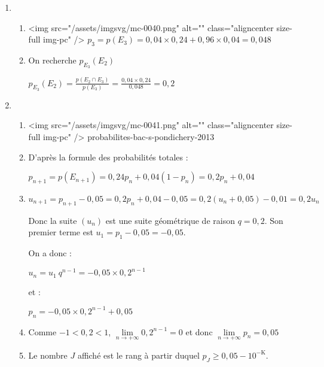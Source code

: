 \begin{corrige}
     \begin{enumerate}
          \item
          \begin{enumerate}[label=\alph*.]
               \item
               <img src="/assets/imgsvg/mc-0040.png" alt="" class="aligncenter size-full  img-pc" />
               $p_{3}=p\left(E_{3}\right)=0,04\times 0,24+0,96\times 0,04=0,048$
               \item
               On recherche $p_{E_{3}}\left(E_{2}\right)$
               \par
               $p_{E_{3}}\left(E_{2}\right)=\frac{p\left(E_{2} \cap  E_{3}\right)}{p\left(E_{3}\right)}=\frac{0,04\times 0,24}{0,048}=0,2$
          \end{enumerate}
          \item
          \begin{enumerate}[label=\alph*.]
               \item
               <img src="/assets/imgsvg/mc-0041.png" alt="" class="aligncenter size-full  img-pc" />
probabilites-bac-s-pondichery-2013\item
               D'après la formule des probabilités totales :
               \par
               $p_{n+1}=p\left(E_{n+1}\right)=0,24p_{n}+0,04\left(1-p_{n}\right)=0,2p_{n}+0,04$
               \item
               $u_{n+1}=p_{n+1}-0,05=0,2p_{n}+0,04-0,05=0,2\left(u_{n}+0,05\right)-0,01=0,2u_{n}$
               \par
               Donc la suite $\left(u_{n}\right)$ est une suite géométrique de raison $q=0,2$. Son premier terme est $u_{1}=p_{1}-0,05=-0,05$.
               \par
               On a donc :
               \par
               $u_{n}=u_1\ q^{n-1}=-0,05\times 0,2^{n-1}$
               \par
               et :
               \par
               $p_{n}=-0,05\times 0,2^{n-1}+0,05$
               \item
               Comme $-1 < 0,2 < 1$, $\lim\limits_{n\rightarrow +\infty }0,2^{n-1}=0$ et donc $\lim\limits_{n\rightarrow +\infty }p_{n}=0,05$
               \item
               Le nombre $J$ affiché est le rang à partir duquel $p_{J}\geqslant  0,05-10^{- \text{K}}$.

\end{enumerate}
\end{enumerate}
\end{corrige}
